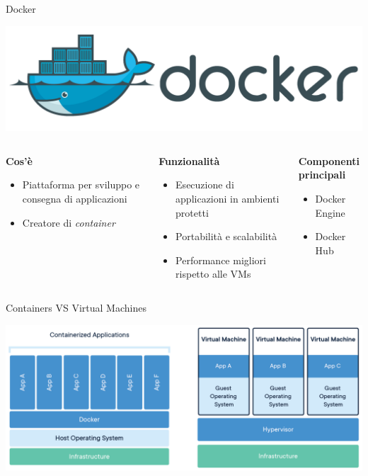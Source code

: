 \documentclass[aspectratio=169]{beamer}
\begin{document}
\begin{frame}{Docker}
    \begin{center}
        \includegraphics[scale=0.13]{img/docker_logo_2.png}
    \end{center}
    \begin{columns}[T]
        \begin{column}{0.333\textwidth}
            \textbf{Cos'è}
            \begin{itemize}
                \item Piattaforma per sviluppo e consegna di applicazioni
                \item Creatore di \emph{container}
            \end{itemize}
        \end{column}
        \begin{column}{0.333\textwidth}
            \textbf{Funzionalità}
            \begin{itemize}
                \item Esecuzione di applicazioni in ambienti protetti
                \item Portabilità e scalabilità
                \item Performance migliori rispetto alle VMs
             \end{itemize}
        \end{column}
        \begin{column}{0.333\textwidth}
            \textbf{Componenti principali}
            \begin{itemize}
                \item Docker Engine
                \item Docker Hub
            \end{itemize}
        \end{column}
    \end{columns}
\end{frame}

\begin{frame}{Containers VS Virtual Machines}
    \begin{center}
        \includegraphics[width=\textwidth]{img/docker-containerized-and-vm-transparent-bg.png}
    \end{center}
\end{frame}
\end{document}
